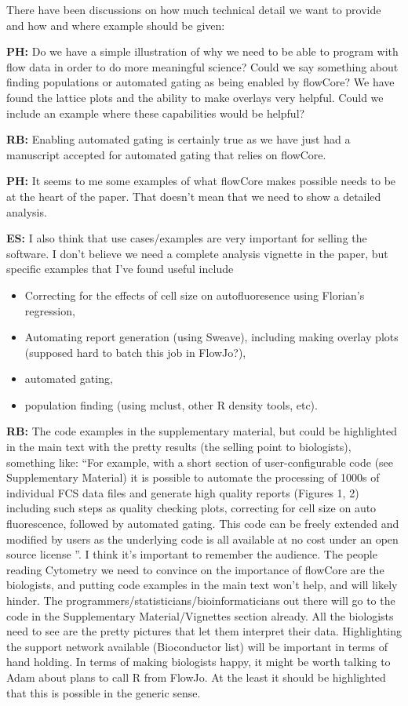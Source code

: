 \documentclass[12pt]{article}
\begin{document}
\bigskip
There have been discussions on how much technical detail we want to
provide and how and where example should be given:

{\bf PH:} Do we have a simple illustration of why we need to be able to
program with flow data in order to do more meaningful science? Could
we say something about finding populations or automated gating as
being enabled by flowCore?  We have found the lattice plots and the
ability to make overlays very helpful. Could we include an example
where these capabilities would be helpful?

{\bf RB:} Enabling automated gating is certainly true as we have just had a
manuscript accepted for automated gating that relies on flowCore.

{\bf PH:} It seems to me some examples of what flowCore makes possible needs
to be at the heart of the paper. That doesn't mean that we need to
show a detailed analysis.

{\bf ES:} I also think that use cases/examples are very important for selling
the software.  I don't believe we need a complete analysis vignette in
the paper, but specific examples that I've found useful include
\begin{itemize}
\item Correcting for the effects of cell size on autofluoresence using
  Florian's regression,
\item Automating report generation (using Sweave), including making
  overlay plots (supposed hard to batch this job in FlowJo?),
\item automated gating,
\item population finding (using mclust, other R density tools, etc).
\end{itemize}

{\bf RB:} The code examples in the supplementary material, but could
be highlighted in the main text with the pretty results (the selling
point to biologists), something like: “For example, with a short
section of user-configurable code (see Supplementary Material) it is
possible to automate the processing of 1000s of individual FCS data
files and generate high quality reports (Figures 1, 2) including such
steps as quality checking plots, correcting for cell size on auto
fluorescence, followed by automated gating.  This code can be freely
extended and modified by users as the underlying code is all available
at no cost under an open source license ”.  I think it’s important
to remember the audience. The people reading Cytometry we need to
convince on the importance of flowCore are the biologists, and putting
code examples in the main text won’t help, and will likely
hinder. The programmers/statisticians/bioinformaticians out there will
go to the code in the Supplementary Material/Vignettes section
already. All the biologists need to see are the pretty pictures that
let them interpret their data. Highlighting the support network
available (Bioconductor list) will be important in terms of hand
holding.  In terms of making biologists happy, it might be worth
talking to Adam about plans to call R from FlowJo. At the least it
should be highlighted that this is possible in the generic sense.
\end{document}
